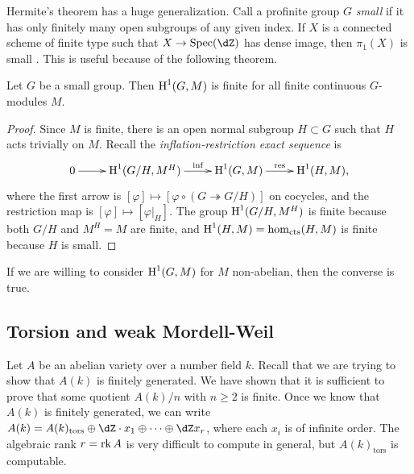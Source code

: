Hermite's theorem has a huge generalization. Call a profinite group $G$ 
\emph{small} if it has only finitely many open subgroups of any given index. 
If $X$ is a connected scheme of finite type such that $X\to \spec(\dZ)$ has 
dense image, then $\pi_1(X)$ is small \cite[2.8]{hh09}. This is useful because 
of the following theorem. 

\begin{theorem}\label{thm:small-groups}
Let $G$ be a small group. Then $\operatorname{H}^1(G,M)$ is finite for all finite 
continuous $G$-modules $M$.
\end{theorem}
\begin{proof}
Since $M$ is finite, there is an open normal subgroup $H\subset G$ such that 
$H$ acts trivially on $M$. Recall the \emph{inflation-restriction exact 
sequence} is 
\[\xymatrix{
  0 \ar[r]
    & \h^1(G/H,M^H) \ar[r]^-{\text{inf}} 
    & \h^1(G,M) \ar[r]^-{\text{res}} 
    & \h^1(H,M) \text{,}
}\]
where the first arrow is 
$[\varphi]\mapsto [\varphi\circ (G\twoheadrightarrow G/H)]$ on cocycles, 
and the restriction map is $[\varphi]\mapsto [\varphi|_H]$. The group 
$\operatorname{H}^1(G/H,M^H)$ is finite because both $G/H$ and $M^H=M$ are finite, and 
$\operatorname{H}^1(H,M)=\hom_\text{cts}(H,M)$ is finite because $H$ is small. 
\end{proof}

If we are willing to consider $\operatorname{H}^1(G,M)$ for $M$ non-abelian, then the 
converse is true. 
















\subsection{Torsion and weak Mordell-Weil}

Let $A$ be an abelian variety over a number field $k$. Recall that we are 
trying to show that $A(k)$ is finitely generated. We have shown that it is 
sufficient to prove that some quotient $A(k)/n$ with $n\geqslant 2$ is finite. 
Once we know that $A(k)$ is finitely generated, we can write 
$A(k)=A(k)_\text{tors}\oplus \dZ\cdot x_1\oplus \cdots \oplus \dZ x_r$, where 
each $x_i$ is of infinite order. The algebraic rank $r=\operatorname{rk} A$ is 
very difficult to compute in general, but $A(k)_\text{tors}$ is computable. 

